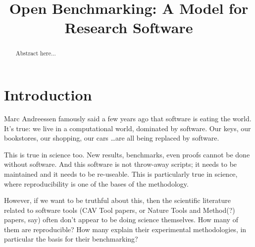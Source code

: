\documentclass[conference]{IEEEtran}
\begin{document}

\title{Open Benchmarking: A Model for Research Software}

\author{
\and
{}
\and
{}
 }

\maketitle

\begin{abstract}
Abstract here...
\end{abstract}

\IEEEpeerreviewmaketitle

\section{Introduction}

Marc Andreessen famously said a few years ago that software is eating
the world. It's true: we live in a computational world, dominated by
software. Our keys, our bookstores, our shopping, our cars \dots are
all being replaced by software.

This is true in science too. New results, benchmarks, even proofs
cannot be done without software. And this software is not throw-away
scripts; it needs to be maintained and it needs to be re-useable. This
is particularly true in science, where reproducibility is one of the
bases of the methodology.

However, if we want to be truthful about this, then the scientific
literature related to software tools (CAV Tool papers, or Nature Tools
and Method(?)  papers, say) often don't appear to be doing science
themselves. How many of them are reproducible? How many explain their
experimental methodologies, in particular the basis for their
benchmarking?
\end{document}
